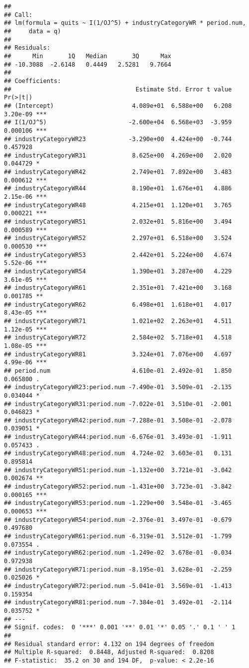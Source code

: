 \documentclass[
]{article}
\begin{document}
\begin{verbatim}
## 
## Call:
## lm(formula = quits ~ I(1/OJ^5) + industryCategoryWR * period.num, 
##     data = q)
## 
## Residuals:
##      Min       1Q   Median       3Q      Max 
## -10.3088  -2.6148   0.4449   2.5281   9.7664 
## 
## Coefficients:
##                                   Estimate Std. Error t value Pr(>|t|)    
## (Intercept)                      4.089e+01  6.588e+00   6.208 3.20e-09 ***
## I(1/OJ^5)                       -2.600e+04  6.568e+03  -3.959 0.000106 ***
## industryCategoryWR23            -3.290e+00  4.424e+00  -0.744 0.457928    
## industryCategoryWR31             8.625e+00  4.269e+00   2.020 0.044729 *  
## industryCategoryWR42             2.749e+01  7.892e+00   3.483 0.000612 ***
## industryCategoryWR44             8.190e+01  1.676e+01   4.886 2.15e-06 ***
## industryCategoryWR48             4.215e+01  1.120e+01   3.765 0.000221 ***
## industryCategoryWR51             2.032e+01  5.816e+00   3.494 0.000589 ***
## industryCategoryWR52             2.297e+01  6.518e+00   3.524 0.000530 ***
## industryCategoryWR53             2.442e+01  5.224e+00   4.674 5.52e-06 ***
## industryCategoryWR54             1.390e+01  3.287e+00   4.229 3.61e-05 ***
## industryCategoryWR61             2.351e+01  7.421e+00   3.168 0.001785 ** 
## industryCategoryWR62             6.498e+01  1.618e+01   4.017 8.43e-05 ***
## industryCategoryWR71             1.021e+02  2.263e+01   4.511 1.12e-05 ***
## industryCategoryWR72             2.584e+02  5.718e+01   4.518 1.08e-05 ***
## industryCategoryWR81             3.324e+01  7.076e+00   4.697 4.99e-06 ***
## period.num                       4.610e-01  2.492e-01   1.850 0.065800 .  
## industryCategoryWR23:period.num -7.490e-01  3.509e-01  -2.135 0.034044 *  
## industryCategoryWR31:period.num -7.022e-01  3.510e-01  -2.001 0.046823 *  
## industryCategoryWR42:period.num -7.288e-01  3.508e-01  -2.078 0.039051 *  
## industryCategoryWR44:period.num -6.676e-01  3.493e-01  -1.911 0.057433 .  
## industryCategoryWR48:period.num  4.724e-02  3.603e-01   0.131 0.895814    
## industryCategoryWR51:period.num -1.132e+00  3.721e-01  -3.042 0.002674 ** 
## industryCategoryWR52:period.num -1.431e+00  3.723e-01  -3.842 0.000165 ***
## industryCategoryWR53:period.num -1.229e+00  3.548e-01  -3.465 0.000653 ***
## industryCategoryWR54:period.num -2.376e-01  3.497e-01  -0.679 0.497680    
## industryCategoryWR61:period.num -6.319e-01  3.512e-01  -1.799 0.073554 .  
## industryCategoryWR62:period.num -1.249e-02  3.678e-01  -0.034 0.972938    
## industryCategoryWR71:period.num -8.195e-01  3.628e-01  -2.259 0.025026 *  
## industryCategoryWR72:period.num -5.041e-01  3.569e-01  -1.413 0.159354    
## industryCategoryWR81:period.num -7.384e-01  3.492e-01  -2.114 0.035752 *  
## ---
## Signif. codes:  0 '***' 0.001 '**' 0.01 '*' 0.05 '.' 0.1 ' ' 1
## 
## Residual standard error: 4.132 on 194 degrees of freedom
## Multiple R-squared:  0.8448, Adjusted R-squared:  0.8208 
## F-statistic:  35.2 on 30 and 194 DF,  p-value: < 2.2e-16
\end{verbatim}
\end{document}
